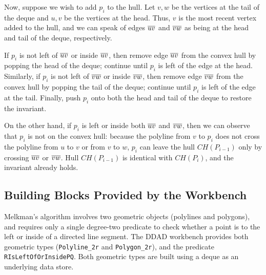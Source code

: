 Now, suppose we wish to add $p_i$ to the hull. Let $v, w$ be the vertices at the
tail of the deque and $u, v$ be the vertices at the head. Thus, $v$ is the most
recent vertex added to the hull, and we can speak of edges $\seg{uv}$ and
$\seg{vw}$ as being at the head and tail of the deque, respectively. 

If $p_i$ is not left of $\seg{uv}$ or inside $\seg{uv}$, then remove edge
$\seg{uv}$ from the convex hull by popping the head of the deque; continue until
$p_i$ is left of the edge at the head. Similarly, if $p_i$ is not left of
$\seg{vw}$ or inside $\seg{vw}$, then remove edge $\seg{vw}$ from the convex
hull by popping the tail of the deque; continue until $p_i$ is left of the edge
at the tail. Finally, push $p_i$ onto both the head and tail of the deque to
restore the invariant.

On the other hand, if $p_i$ is left or inside both $\seg{uv}$ and $\seg{vw}$,
then we can observe that $p_i$ is not on the convex hull: because the polyline
from $v$ to $p_i$ does not cross the polyline from $u$ to $v$ or from $v$ to
$w$, $p_i$ can leave the hull $CH(P_{i-1})$ only by crossing $\seg{uv}$ or
$\seg{vw}$. Hull $CH(P_{i-1})$ is identical with $CH(P_i)$, and the invariant
already holds.


\FloatBarrier
\subsection{Building Blocks Provided by the Workbench}

Melkman's algorithm involves two geometric objects (polylines and polygons), and
requires only a single degree-two predicate to check whether a point is to the
left or inside of a directed line segment. The DDAD workbench provides both
geometric types (\texttt{Polyline\_2r} and \texttt{Polygon\_2r}), and the
predicate \texttt{RIsLeftOfOrInsidePQ}. Both geometric types are built using a
deque as an underlying data store.



